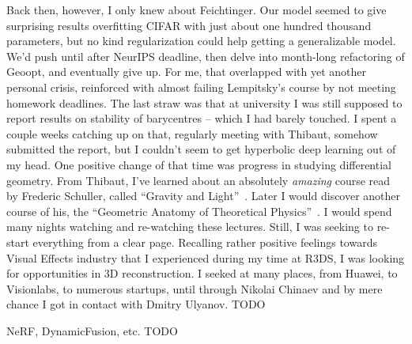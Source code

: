 Back then, however, I only knew about Feichtinger. Our model seemed to give
surprising results overfitting CIFAR with just about one hundred thousand
parameters, but no kind regularization could help getting a generalizable
model. We'd push until after NeurIPS deadline, then delve into month-long
refactoring of Geoopt, and eventually give up. For me, that overlapped with yet
another personal crisis, reinforced with almost failing Lempitsky's course by
not meeting homework deadlines. The last straw was that at university I was
still supposed to report results on stability of barycentres -- which I had
barely touched. I spent a couple weeks catching up on that, regularly meeting
with Thibaut, somehow submitted the report, but I couldn't seem to get
hyperbolic deep learning out of my head. One positive change of that time was
progress in studying differential geometry. From Thibaut, I've learned about an
absolutely \emph{amazing} course read by Frederic Schuller, called ``Gravity
and Light''~\citep{gravityLight}.  Later I would discover another course of
his, the ``Geometric Anatomy of Theoretical
Physics''~\citep{geometricAnatomy}. I would spend many nights watching and
re-watching these lectures.
Still, I was seeking to re-start everything from a clear page. Recalling rather
positive feelings towards Visual Effects industry that I experienced during my
time at R3DS, I was looking for opportunities in 3D reconstruction. I seeked at
many places, from Huawei, to Visionlabs, to numerous startups, until through
Nikolai Chinaev and by mere chance I got in contact with Dmitry Ulyanov. TODO

NeRF, DynamicFusion, etc. TODO
